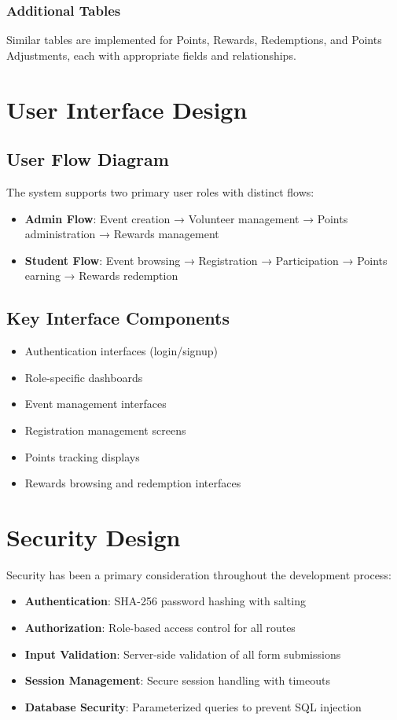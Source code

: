 \documentclass[12pt,a4paper]{report}
\begin{document}
\subsubsection{Additional Tables}
Similar tables are implemented for Points, Rewards, Redemptions, and Points Adjustments, each with appropriate fields and relationships.

\section{User Interface Design}

\subsection{User Flow Diagram}
The system supports two primary user roles with distinct flows:

\begin{itemize}
    \item \textbf{Admin Flow}: Event creation → Volunteer management → Points administration → Rewards management
    \item \textbf{Student Flow}: Event browsing → Registration → Participation → Points earning → Rewards redemption
\end{itemize}

\subsection{Key Interface Components}

\begin{itemize}
    \item Authentication interfaces (login/signup)
    \item Role-specific dashboards
    \item Event management interfaces
    \item Registration management screens
    \item Points tracking displays
    \item Rewards browsing and redemption interfaces
\end{itemize}

\section{Security Design}
Security has been a primary consideration throughout the development process:

\begin{itemize}
    \item \textbf{Authentication}: SHA-256 password hashing with salting
    \item \textbf{Authorization}: Role-based access control for all routes
    \item \textbf{Input Validation}: Server-side validation of all form submissions
    \item \textbf{Session Management}: Secure session handling with timeouts
    \item \textbf{Database Security}: Parameterized queries to prevent SQL injection
\end{itemize}
\end{document}
